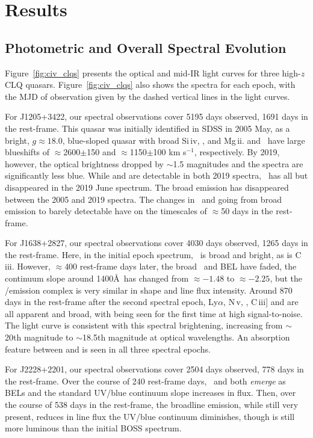 \documentclass[fleqn,usenatbib]{mnras}
\begin{document}
\section{Results}
\subsection{Photometric and Overall Spectral Evolution}
Figure~\ref{fig:civ_clqs} presents the optical and mid-IR light
curves for three high-$z$ CLQ quasars.  Figure~\ref{fig:civ_clqs} also
shows the spectra for each epoch, with the MJD of observation given by
the dashed vertical lines in the light curves.

For J1205+3422, our spectral observations cover 5195 days observed,
1691 days in the rest-frame. This quasar was initially identified in
SDSS in 2005 May, as a bright, $g\approx18.0$, blue-sloped quasar with
broad Si\,{\sc iv}, \civ, \ciii and Mg\,{\sc ii}. \ciii and \civ\ have large
blueshifts of $\approx$2600$\pm$150 and $\approx$1150$\pm$100 km
s$^{-1}$, respectively.  By 2019, however, the optical brightness
dropped by $\sim$1.5 magnitudes and the spectra are significantly less
blue.  While \lya and \nv are detectable in both 2019 spectra, \civ\
has all but disappeared in the 2019 June spectrum.  The broad \ciii
emission has disappeared between the 2005 and 2019 spectra. The
changes in \civ\ and \ciii going from broad emission to barely
detectable have on the timescales of $\approx$50 days in the
rest-frame.

For J1638+2827, our spectral observations cover 4030 days observed,
1265 days in the rest-frame. Here, in the initial epoch spectrum,
\civ\ is broad and bright, as is C\,{\sc iii}. However, $\approx$400
rest-frame days later, the broad \civ\ and \ciii BEL have faded, the
continuum slope around 1400\AA\ has changed from $\approx-1.48$ to
$\approx-2.25$, but the \lya/\nv emission complex is very similar in
shape and line flux intensity. Around 870 days in the rest-frame after
the second spectral epoch, Ly$\alpha$, N\,{\sc v}, \civ, C\,{\sc iii}] and \mgii are all
apparent and broad, with \mgii being seen for the first time at high
signal-to-noise. The light curve is consistent with this spectral
brightening, increasing from $\sim$20th magnitude to $\sim$18.5th 
magnitude at optical wavelengths. An absorption feature between \lya
and \nv is seen in all three spectral epochs.

For J2228+2201, our spectral observations cover 2504 days observed,
778 days in the rest-frame. Over the course of 240 rest-frame days,
\civ\ and \ciii both {\it emerge} as BELs and the standard UV/blue
continuum slope increases in flux.  Then, over the course of 538 days
in the rest-frame, the broadline emission, while still very present,
reduces in line flux the UV/blue continuum diminishes, though is still
more luminous than the initial BOSS spectrum.
\end{document}
